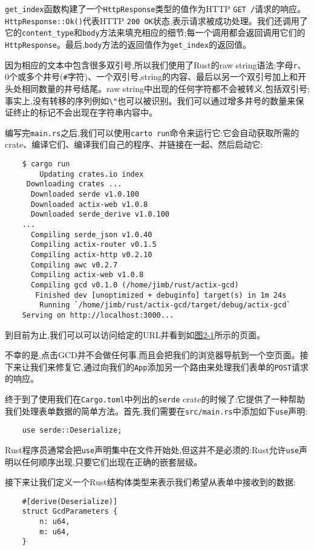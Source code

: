 \texttt{get\_index}函数构建了一个\texttt{HttpResponse}类型的值作为HTTP \texttt{GET /}请求的响应。\texttt{HttpResponse::Ok()}代表HTTP \texttt{200 OK}状态,表示请求被成功处理。我们还调用了它的\texttt{content\_type}和\texttt{body}方法来填充相应的细节;每一个调用都会返回调用它们的\texttt{HttpResponse}。最后,\texttt{body}方法的返回值作为\texttt{get\_index}的返回值。

因为相应的文本中包含很多双引号,所以我们使用了Rust的raw string语法:字母\texttt{r}、0个或多个井号(\texttt{\#}字符)、一个双引号,string的内容、最后以另一个双引号加上和开头处相同数量的井号结尾。raw string中出现的任何字符都不会被转义,包括双引号;事实上,没有转移的序列例如\texttt{\textbackslash"}也可以被识别。我们可以通过增多井号的数量来保证终止的标记不会出现在字符串内容中。

编写完\texttt{main.rs}之后,我们可以使用\texttt{carto run}命令来运行它:它会自动获取所需的crate、编译它们、编译我们自己的程序、并链接在一起、然后启动它:
\begin{verbatim}
    $ cargo run
        Updating crates.io index
     Downloading crates ...
      Downloaded serde v1.0.100
      Downloaded actix-web v1.0.8
      Downloaded serde_derive v1.0.100
    ...
      Compiling serde_json v1.0.40
      Compiling actix-router v0.1.5
      Compiling actix-http v0.2.10
      Compiling awc v0.2.7
      Compiling actix-web v1.0.8
      Compiling gcd v0.1.0 (/home/jimb/rust/actix-gcd)
       Finished dev [unoptimized + debuginfo] target(s) in 1m 24s
        Running `/home/jimb/rust/actix-gcd/target/debug/actix-gcd`
    Serving on http://localhost:3000...
\end{verbatim}

到目前为止,我们可以可以访问给定的URL并看到如\hyperref[f2-1]{图2-1}所示的页面。

不幸的是,点击GCD并不会做任何事,而且会把我们的浏览器导航到一个空页面。接下来让我们来修复它,通过向我们的\texttt{App}添加另一个路由来处理我们表单的\texttt{POST}请求的响应。

终于到了使用我们在\texttt{Cargo.toml}中列出的\texttt{serde} crate的时候了:它提供了一种帮助我们处理表单数据的简单方法。首先,我们需要在\texttt{src/main.rs}中添加如下\texttt{use}声明:
\begin{verbatim}
    use serde::Deserialize;
\end{verbatim}

Rust程序员通常会把\texttt{use}声明集中在文件开始处,但这并不是必须的:Rust允许\texttt{use}声明以任何顺序出现,只要它们出现在正确的嵌套层级。

接下来让我们定义一个Rust结构体类型来表示我们希望从表单中接收到的数据:
\begin{verbatim}
    #[derive(Deserialize)]
    struct GcdParameters {
        n: u64,
        m: u64,
    }
\end{verbatim}

